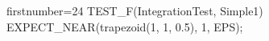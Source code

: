 \begin{cppcode*}{firstnumber=24}
TEST_F(IntegrationTest, Simple1) {
  EXPECT_NEAR(trapezoid(1, 1, 0.5), 1, EPS);
}
\end{cppcode*}
